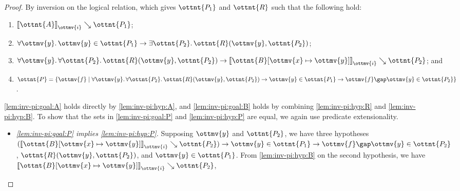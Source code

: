 \documentclass[a4paper,UKenglish,cleveref,autoref,thm-restate]{lipics-v2021}
\begin{document}
\begin{proof}
  By inversion on the logical relation,
  which gives $\ottnt{P_{{\mathrm{1}}}}$ and $\ottnt{R}$ such that the following hold:
  \begin{enumerate}[start=4]
    \item \label{lem:inv-pi:hyp:A} $ \mathopen{\llbracket}  \ottnt{A}  \mathclose{\rrbracket}_{ \ottmv{i} } \searrow  \ottnt{P_{{\mathrm{1}}}} $;
    \item \label{lem:inv-pi:hyp:R} $  \forall  \ottmv{y}  \mathpunct{.}   \ottmv{y}  \in  \ottnt{P_{{\mathrm{1}}}}    \to   \exists  \ottnt{P_{{\mathrm{2}}}}  \mathpunct{.}   \ottnt{R} ( \ottmv{y} ,  \ottnt{P_{{\mathrm{2}}}} )   $;
    \item \label{lem:inv-pi:hyp:B} $  \forall  \ottmv{y}  \mathpunct{.}   \forall  \ottnt{P_{{\mathrm{2}}}}  \mathpunct{.}   \ottnt{R} ( \ottmv{y} ,  \ottnt{P_{{\mathrm{2}}}} )     \to   \mathopen{\llbracket}   \ottnt{B} [  \ottmv{x}  \mapsto  \ottmv{y}  ]   \mathclose{\rrbracket}_{ \ottmv{i} } \searrow  \ottnt{P_{{\mathrm{2}}}}  $; and
    \item \label{lem:inv-pi:hyp:P} $\ottnt{P} =  \lbrace  \ottmv{f}  \mid   \forall  \ottmv{y}  \mathpunct{.}    \forall  \ottnt{P_{{\mathrm{2}}}}  \mathpunct{.}    \ottnt{R} ( \ottmv{y} ,  \ottnt{P_{{\mathrm{2}}}} )   \to   \ottmv{y}  \in  \ottnt{P_{{\mathrm{1}}}}     \to    \ottmv{f}  \gap  \ottmv{y}   \in  \ottnt{P_{{\mathrm{2}}}}     \rbrace $.
  \end{enumerate}
  \ref{lem:inv-pi:goal:A} holds directly by \ref{lem:inv-pi:hyp:A},
  and \ref{lem:inv-pi:goal:B} holds by combining \ref{lem:inv-pi:hyp:R} and \ref{lem:inv-pi:hyp:B}.
  To show that the sets in \ref{lem:inv-pi:goal:P} and \ref{lem:inv-pi:hyp:P} are equal,
  we again use predicate extensionality.
  \begin{itemize}
    \item \textit{\ref{lem:inv-pi:goal:P} implies \ref{lem:inv-pi:hyp:P}.}
      Supposing $\ottmv{y}$ and $\ottnt{P_{{\mathrm{2}}}}$,
      we have three hypotheses $   (  \mathopen{\llbracket}   \ottnt{B} [  \ottmv{x}  \mapsto  \ottmv{y}  ]   \mathclose{\rrbracket}_{ \ottmv{i} } \searrow  \ottnt{P_{{\mathrm{2}}}}  )   \to   \ottmv{y}  \in  \ottnt{P_{{\mathrm{1}}}}    \to    \ottmv{f}  \gap  \ottmv{y}   \in  \ottnt{P_{{\mathrm{2}}}}  $,
      $ \ottnt{R} ( \ottmv{y} ,  \ottnt{P_{{\mathrm{2}}}} ) $, and $ \ottmv{y}  \in  \ottnt{P_{{\mathrm{1}}}} $.
      From \ref{lem:inv-pi:hyp:B} on the second hypothesis,
      we have $ \mathopen{\llbracket}   \ottnt{B} [  \ottmv{x}  \mapsto  \ottmv{y}  ]   \mathclose{\rrbracket}_{ \ottmv{i} } \searrow  \ottnt{P_{{\mathrm{2}}}} $,

\end{itemize}
\end{proof}
\end{document}
